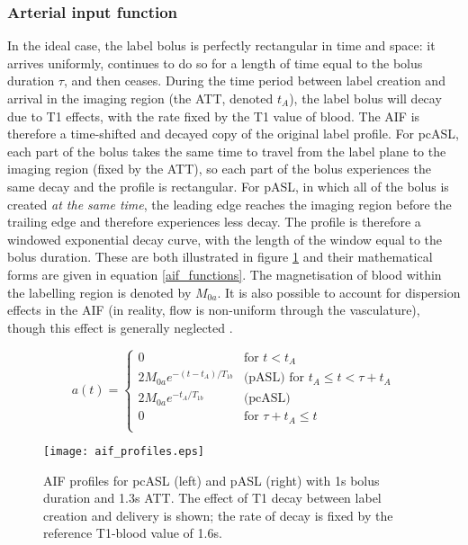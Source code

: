 \subsubsection{Arterial input function}

In the ideal case, the label bolus is perfectly rectangular in time and space: it arrives uniformly, continues to do so for a length of time equal to the bolus duration $\tau$, and then ceases. During the time period between label creation and arrival in the imaging region (the ATT, denoted $t_A$), the label bolus will decay due to T1 effects, with the rate fixed by the T1 value of blood. The AIF is therefore a time-shifted and decayed copy of the original label profile. For pcASL, each part of the bolus takes the same time to travel from the label plane to the imaging region (fixed by the ATT), so each part of the bolus experiences the same decay and the profile is rectangular. For pASL, in which all of the bolus is created \textit{at the same time}, the leading edge reaches the imaging region before the trailing edge and therefore experiences less decay. The profile is therefore a windowed exponential decay curve, with the length of the window equal to the bolus duration. These are both illustrated in figure \ref{aif_profiles} and their mathematical forms are given in equation \ref{aif_functions}. The magnetisation of blood within the labelling region is denoted by $M_{0a}$. It is also possible to account for dispersion effects in the AIF (in reality, flow is non-uniform through the vasculature), though this effect is generally neglected \cite{asl_primer}. 

\begin{equation}
  a(t) =
  \begin{cases}
    0 & \text{for } t < t_{A} \\
    2M_{0a}e^{-(t-t_{A})/T_{1b}} & \text{(pASL) for } t_{A} \leq t < \tau + t_{A} \\
    2M_{0a}e^{-t_{A}/T_{1b}} & \text{(pcASL) } \\
    0 & \text{for } \tau + t_{A} \leq t \\
  \end{cases}
  \label{aif_functions}
\end{equation}


\begin{figure}[H]
\centering
\texttt{[image: aif\_profiles.eps]}
\caption{AIF profiles for pcASL (left) and pASL (right) with 1s bolus duration and 1.3s ATT. The effect of T1 decay between label creation and delivery is shown; the rate of decay is fixed by the reference T1-blood value of 1.6s.}
\label{aif_profiles}
\end{figure}

